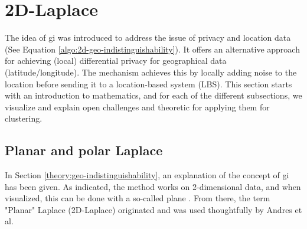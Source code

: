 %
\newpage
\section{2D-Laplace}
The idea of \gls{gi} was introduced to address the issue of privacy and location data \citep{DBLP:journals/corr/abs-1212-1984} (See Equation \ref{algo:2d-geo-indistinguishability}).
It offers an alternative approach for achieving (local) differential privacy for geographical data (latitude/longitude).
The mechanism achieves this by locally adding noise to the location before sending it to a location-based system (LBS).
This section starts with an introduction to mathematics, and for each of the different subsections, we visualize and explain open challenges and theoretic for applying them for clustering.
\subsection{Planar and polar Laplace}
In Section \ref{theory:geo-indistinguishability}, an explanation of the concept of \gls{gi} has been given.
As indicated, the method works on 2-dimensional data, and when visualized, this can be done with a so-called plane \citep{DBLP:journals/corr/abs-1212-1984}.
From there, the term "Planar" Laplace (2D-Laplace) originated and was used thoughtfully by Andres et al.

